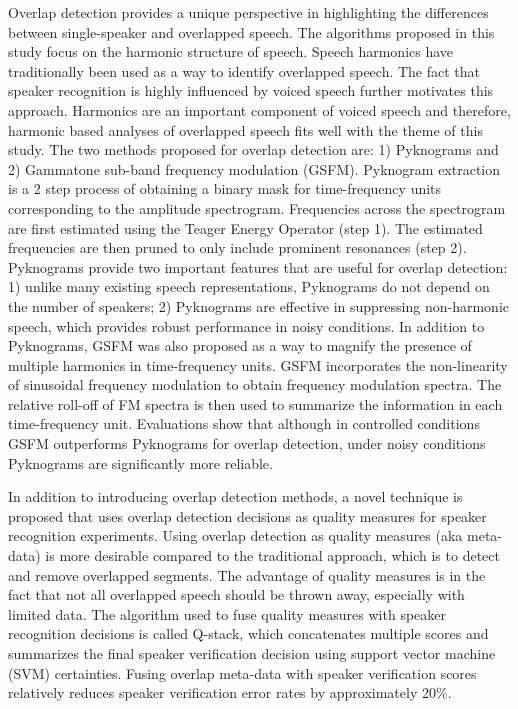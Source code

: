 Overlap detection provides a unique perspective in highlighting the differences between single-speaker and overlapped speech. 
The algorithms proposed in this study focus on the harmonic structure of speech. 
Speech harmonics have traditionally been used as a way to identify overlapped speech. 
The fact that speaker recognition is highly influenced by voiced speech further motivates this approach. 
Harmonics are an important component of voiced speech and therefore, harmonic based analyses of overlapped speech fits well with the theme of this study. 
The two methods proposed for overlap detection are: 1) Pyknograms and 2) Gammatone sub-band frequency modulation (GSFM). 
Pyknogram extraction is a 2 step process of obtaining a binary mask for time-frequency units corresponding to the amplitude spectrogram. 
Frequencies across the spectrogram are first estimated using the Teager Energy Operator (step 1). 
The estimated frequencies are then pruned to only include prominent resonances (step 2). 
Pyknograms provide two important features that are useful for overlap detection: 1) unlike many existing speech representations, Pyknograms do not depend on the number of speakers; 2) Pyknograms are effective in suppressing non-harmonic speech, which provides robust performance in noisy conditions. 
In addition to Pyknograms, GSFM was also proposed as a way to magnify the presence of multiple harmonics in time-frequency units. 
GSFM incorporates the non-linearity of sinusoidal frequency modulation to obtain frequency modulation spectra. 
The relative roll-off of FM spectra is then used to summarize the information in each time-frequency unit. 
Evaluations show that although in controlled conditions GSFM outperforms Pyknograms for overlap detection, under noisy conditions Pyknograms are significantly more reliable. 

In addition to introducing overlap detection methods, a novel technique is proposed that uses overlap detection decisions as quality measures for speaker recognition experiments. 
Using overlap detection as quality measures (aka meta-data) is more desirable compared to the traditional approach, which is to detect and remove overlapped segments. 
The advantage of quality measures is in the fact that not all overlapped speech should be thrown away, especially with limited data. 
The algorithm used to fuse quality measures with speaker recognition decisions is called Q-stack, which concatenates multiple scores and summarizes the final speaker verification decision using support vector machine (SVM) certainties. 
Fusing overlap meta-data with speaker verification scores relatively reduces speaker verification error rates by approximately 20\%. 

